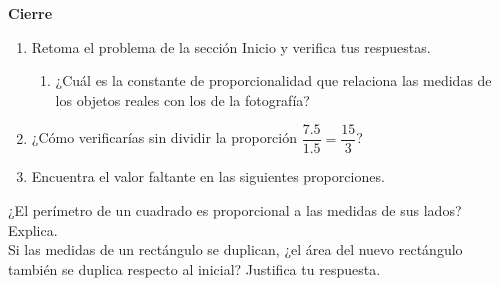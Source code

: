 \begin{boxK}
    \begin{center}\textbf{Cierre}\end{center}

    \begin{enumerate}
        \item Retoma el problema de la sección Inicio y verifica tus respuestas.
              \begin{enumerate}
                  \item ¿Cuál es la constante de proporcionalidad que relaciona las medidas de los
                        objetos reales con los de la fotografía?
              \end{enumerate}
        \item ¿Cómo verificarías sin dividir la proporción $\dfrac{7.5}{1.5} = \dfrac{15}{3}$?
        \item Encuentra el valor faltante en las siguientes proporciones.\\

    \end{enumerate}
\end{boxK}

\begin{boxH}
    ¿El perímetro de un cuadrado es proporcional a las medidas de sus lados?
    Explica.\\
    Si las medidas de un rectángulo se duplican, ¿el área del nuevo rectángulo
    también se duplica respecto al inicial? Justifica tu respuesta.
\end{boxH}

\newpage